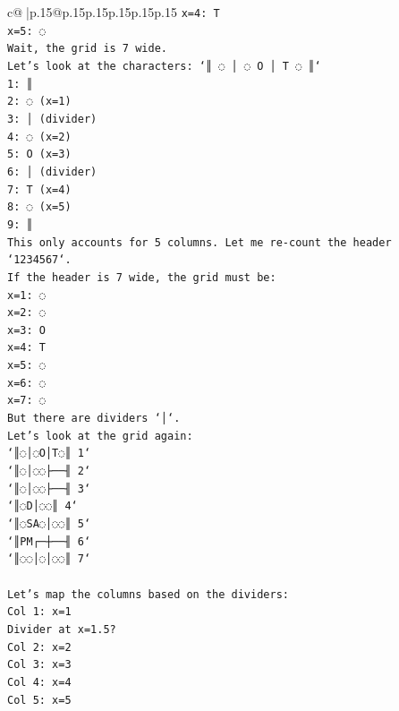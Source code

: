 \documentclass{article}
\begin{document}
{\begin{supertabular}{c@{$\;$}|p{.15\linewidth}@{}p{.15\linewidth}p{.15\linewidth}p{.15\linewidth}p{.15\linewidth}p{.15\linewidth}}
{{{\texttt{x=4: T} \\
\texttt{x=5: ◌} \\
\texttt{Wait, the grid is 7 wide.} \\
\texttt{Let's look at the characters: `║ ◌ │ ◌ O │ T ◌ ║`} \\
\texttt{1: ║} \\
\texttt{2: ◌ (x=1)} \\
\texttt{3: │ (divider)} \\
\texttt{4: ◌ (x=2)} \\
\texttt{5: O (x=3)} \\
\texttt{6: │ (divider)} \\
\texttt{7: T (x=4)} \\
\texttt{8: ◌ (x=5)} \\
\texttt{9: ║} \\
\texttt{This only accounts for 5 columns. Let me re{-}count the header `1234567`.} \\
\texttt{If the header is 7 wide, the grid must be:} \\
\texttt{x=1: ◌} \\
\texttt{x=2: ◌} \\
\texttt{x=3: O} \\
\texttt{x=4: T} \\
\texttt{x=5: ◌} \\
\texttt{x=6: ◌} \\
\texttt{x=7: ◌} \\
\texttt{But there are dividers `│`.} \\
\texttt{Let's look at the grid again:} \\
\texttt{`║◌│◌O│T◌║ 1`} \\
\texttt{`║◌│◌◌├──╢ 2`} \\
\texttt{`║◌│◌◌├──╢ 3`} \\
\texttt{`║◌D│◌◌║ 4`} \\
\texttt{`║◌SA◌│◌◌║ 5`} \\
\texttt{`║PM┌─┼──╢ 6`} \\
\texttt{`║◌◌│◌│◌◌║ 7`} \\
\\ 
\texttt{Let's map the columns based on the dividers:} \\
\texttt{Col 1: x=1} \\
\texttt{Divider at x=1.5?} \\
\texttt{Col 2: x=2} \\
\texttt{Col 3: x=3} \\
\texttt{Col 4: x=4} \\
\texttt{Col 5: x=5} \\
}}}
\end{supertabular}}
\end{document}
